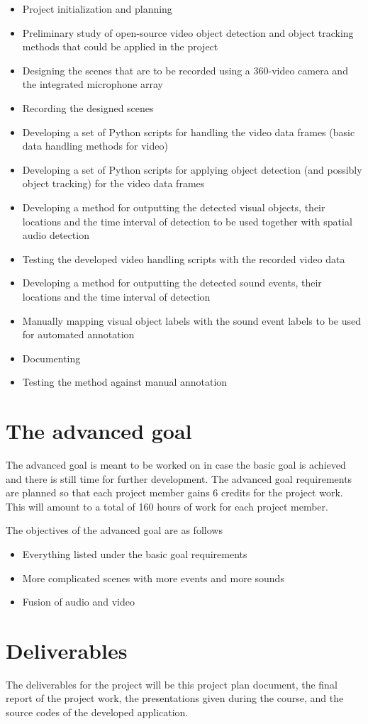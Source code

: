 \begin{itemize}
	\item Project initialization and planning
	\item Preliminary study of open-source video object detection and object tracking methods that could be applied in the project
	\item Designing the scenes that are to be recorded using a 360-video camera and the integrated microphone array
	\item Recording the designed scenes
	\item Developing a set of Python scripts for handling the video data frames (basic data handling methods for video)
	\item Developing a set of Python scripts for applying object detection (and possibly object tracking) for the video data frames
	\item Developing a method for outputting the detected visual objects, their locations and the time interval of detection to be used together with spatial audio detection
	\item Testing the developed video handling scripts with the recorded video data
	\item Developing a method for outputting the detected sound events, their locations and the time interval of detection
	\item Manually mapping visual object labels with the sound event labels to be used for automated annotation
	\item Documenting
	\item Testing the method against manual annotation
\end{itemize} 

\section{The advanced goal}

The advanced goal is meant to be worked on in case the basic goal is achieved and there is still time for further development. The advanced goal requirements are planned so that each project member gains 6 credits for the project work. This will amount to a total of 160 hours of work for each project member. 

The objectives of the advanced goal are as follows

\begin{itemize}
	\item Everything listed under the basic goal requirements
	\item More complicated scenes with more events and more sounds
	\item Fusion of audio and video
\end{itemize} 


\section{Deliverables}

The deliverables for the project will be this project plan document, the final report of the project work, the presentations given during the course, and the source codes of the developed application. 